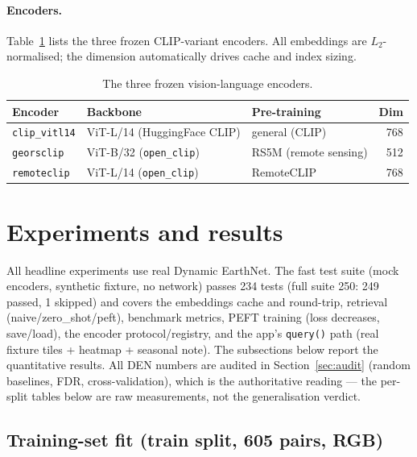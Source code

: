 \documentclass{article}
\begin{document}
\paragraph{Encoders.}
Table~\ref{tab:encoders} lists the three frozen CLIP-variant encoders. All
embeddings are $L_2$-normalised; the dimension automatically drives cache and
index sizing.

\begin{table}[H]
    \centering
    \caption{The three frozen vision-language encoders.}
    \label{tab:encoders}
    \begin{tabular}{lllr}
        \toprule
        \textbf{Encoder} & \textbf{Backbone} & \textbf{Pre-training} & \textbf{Dim} \\
        \midrule
        \texttt{clip\_vitl14} & ViT-L/14 (HuggingFace CLIP)        & general (CLIP)       & 768 \\
        \texttt{georsclip}    & ViT-B/32 (\texttt{open\_clip})     & RS5M (remote sensing) & 512 \\
        \texttt{remoteclip}   & ViT-L/14 (\texttt{open\_clip})     & RemoteCLIP            & 768 \\
        \bottomrule
    \end{tabular}
\end{table}


\section{Experiments and results}
\label{sec:results}

All headline experiments use real Dynamic EarthNet. The fast test suite (mock
encoders, synthetic fixture, no network) passes 234 tests (full suite
250: 249 passed, 1 skipped) and covers the embeddings cache and round-trip,
retrieval (naive/zero\_shot/peft), benchmark metrics, PEFT training
(loss decreases, save/load), the encoder protocol/registry, and the app's
\texttt{query()} path (real fixture tiles + heatmap + seasonal note). The
subsections below report the quantitative results. All DEN numbers are
audited in Section~\ref{sec:audit} (random baselines, FDR, cross-validation),
which is the authoritative reading --- the per-split tables below are raw
measurements, not the generalisation verdict.

\subsection{Training-set fit (train split, 605 pairs, RGB)}
\label{sec:indist}
\end{document}
